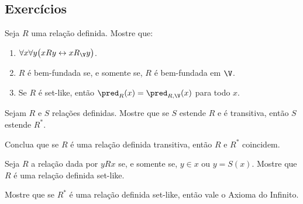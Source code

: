 \subsection*{Exercícios}
\begin{exercise}[$\BST$]\label{exr:relacaoBemFundadaEmV}
    Seja $R$ uma relação definida.
    Mostre que:
    \begin{enumerate}[label=(\roman*)]
        \item $\forall x \forall y\big(x R y \leftrightarrow x R_{\V} y\big)$.
        \item $R$ é bem-fundada se, e somente se, $R$ é bem-fundada em $\V$.
        \item Se $R$ é set-like, então $\pred_{R}(x)=\pred_{R, \V}(x)$ para todo $x$.
    \end{enumerate}
\end{exercise}

\begin{exercise}[$\ZFmP$]\label{ex:fechoTransitivo}
    Sejam $R$ e $S$ relações definidas.
    Mostre que se $S$ estende $R$ e é transitiva, então $S$ estende $R^*$.

    Conclua que se $R$ é uma relação definida transitiva, então $R$ e $R^*$ coincidem.
\end{exercise}

\begin{exercise}[$\BST$]\label{exr:transitivizacaoEInfinito}
    Seja $R$ a relação dada por $y R x$ se, e somente se, $y\in x$ ou $y=S(x)$.
    Mostre que $R$ é uma relação definida set-like.

    Mostre que se $R^*$ é uma relação definida set-like, então vale o Axioma do Infinito.
\end{exercise}
